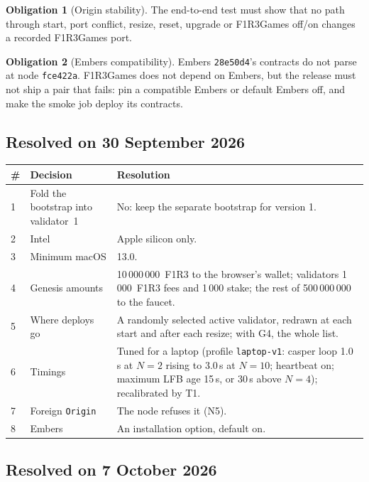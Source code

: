 \documentclass[11pt]{article}
\theoremstyle{definition}
\newtheorem{obligation}{Obligation}
\theoremstyle{remark}
\newcommand{\code}[1]{\texttt{#1}}
\newcommand{\Gm}{F1R3Games}
\newcommand{\Em}{Embers}
\begin{document}
\begin{obligation}[Origin stability]\label{ob:origin}
The end-to-end test must show that no path through start, port conflict, resize,
reset, upgrade or \Gm{} off/on changes a recorded \Gm{} port.
\end{obligation}

\begin{obligation}[\Em{} compatibility]\label{ob:embers}
\Em{} \code{28e50d4}'s contracts do not parse at node \code{fce422a}. \Gm{} does not
depend on \Em{}, but the release must not ship a pair that fails: pin a compatible
\Em{} or default \Em{} off, and make the smoke job deploy its contracts.
\end{obligation}

\subsection{Resolved on 30 September 2026}\label{sec:resolved}

\begin{center}\small
\renewcommand{\arraystretch}{1.12}
\begin{tabularx}{\linewidth}{@{}p{0.6cm}p{3.6cm}X@{}}
\toprule
\# & Decision & Resolution\\
\midrule
1 & Fold the bootstrap into validator~1 & No: keep the separate bootstrap for version 1.\\
2 & Intel & Apple silicon only.\\
3 & Minimum macOS & 13.0.\\
4 & Genesis amounts & 10\,000\,000~F1R3 to the browser's wallet; validators 1\,000~F1R3 fees and 1\,000 stake; the rest of 500\,000\,000 to the faucet.\\
5 & Where deploys go & A randomly selected active validator, redrawn at each start and after each resize; with G4, the whole list.\\
6 & Timings & Tuned for a laptop (profile \code{laptop-v1}: casper loop 1.0\,s at $N=2$ rising to 3.0\,s at $N=10$; heartbeat on; maximum LFB age 15\,s, or 30\,s above $N=4$); recalibrated by T1.\\
7 & Foreign \code{Origin} & The node refuses it (N5).\\
8 & \Em{} & An installation option, default on.\\
\bottomrule
\end{tabularx}
\end{center}

\subsection{Resolved on 7 October 2026}\label{sec:resolved4}
\end{document}
